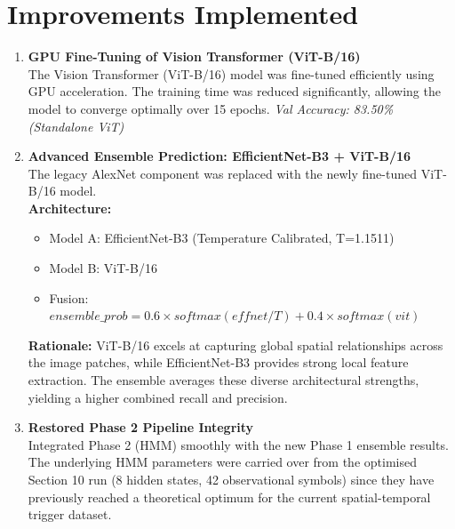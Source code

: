 \documentclass[11pt]{article}
\begin{document}
\section{Improvements Implemented}

\begin{enumerate}
    \item \textbf{GPU Fine-Tuning of Vision Transformer (ViT-B/16)} \\
          The Vision Transformer (ViT-B/16) model was fine-tuned efficiently using GPU acceleration. The training time was reduced significantly, allowing the model to converge optimally over 15 epochs.
          \textit{Val Accuracy: 83.50\% (Standalone ViT)}
    \item \textbf{Advanced Ensemble Prediction: EfficientNet-B3 + ViT-B/16} \\
          The legacy AlexNet component was replaced with the newly fine-tuned ViT-B/16 model. \\
          \textbf{Architecture:}
          \begin{itemize}
              \item Model A: EfficientNet-B3 (Temperature Calibrated, T=1.1511)
              \item Model B: ViT-B/16
              \item Fusion: $ensemble\_prob = 0.6 \times softmax(effnet/T) + 0.4 \times softmax(vit)$
          \end{itemize}
          \textbf{Rationale:} ViT-B/16 excels at capturing global spatial relationships across the image patches, while EfficientNet-B3 provides strong local feature extraction. The ensemble averages these diverse architectural strengths, yielding a higher combined recall and precision.
    \item \textbf{Restored Phase 2 Pipeline Integrity} \\
          Integrated Phase 2 (HMM) smoothly with the new Phase 1 ensemble results. The underlying HMM parameters were carried over from the optimised Section 10 run (8 hidden states, 42 observational symbols) since they have previously reached a theoretical optimum for the current spatial-temporal trigger dataset.
\end{enumerate}
\end{document}
